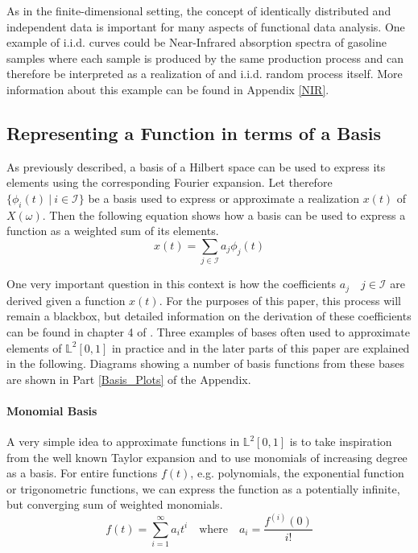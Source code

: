 \documentclass[11pt,twoside,a4paper]{article}
\begin{document}
	As in the finite-dimensional setting, the concept of identically distributed and independent data is important for many aspects of functional data analysis. One example of i.i.d. curves could be Near-Infrared absorption spectra of gasoline samples where each sample is produced by the same production process and can therefore be interpreted as a realization of and i.i.d. random process itself. More information about this example can be found in Appendix \ref{NIR}.
	
	\subsection{Representing a Function in terms of a Basis}\label{bases}
	As previously described, a basis of a Hilbert space can be used to express its elements using the corresponding Fourier expansion. Let therefore $\{\phi_i(t) \: \vert \: i \in \mathcal{I}\}$ be a basis used to express or approximate a realization $x(t)$ of $X(\omega)$. Then the following equation shows how a basis can be used to express a function as a weighted sum of its elements.
	\begin{equation}
		x(t) = \sum_{j \in \mathcal{I}} a_j \phi_j(t) 
	\end{equation}
	
	One very important question in this context is how the coefficients $a_j \quad j \in \mathcal{I}$ are derived given a function $x(t)$. For the purposes of this paper, this process will remain a blackbox, but detailed information on the derivation of these coefficients can be found in chapter 4 of \cite{ramsay_functional_2005}.
	Three examples of bases often used to approximate elements of $\mathbb{L}^2[0,1]$ in practice and in the later parts of this paper are explained in the following. Diagrams showing a number of basis functions from these bases are shown in Part \ref{Basis_Plots} of the Appendix.
	
	\paragraph{Monomial Basis}\label{Monomial_basis}
	A very simple idea to approximate functions in $\mathbb{L}^2[0,1]$ is to take inspiration from the well known Taylor expansion and to use monomials of increasing degree as a basis. For entire functions $f(t)$, e.g. polynomials, the exponential function or trigonometric functions, we can express the function as a potentially infinite, but converging sum of weighted monomials.
	\begin{equation}\label{Taylor_expansion}
		f(t) = \sum_{i = 1}^{\infty}a_i t^i \quad \text{where} \quad a_i = \frac{f^{(i)}(0)}{i!}
	\end{equation}
	
\end{document}
